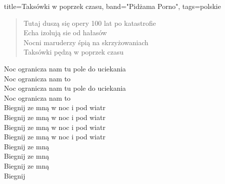\documentclass{article}
\begin{document}
\begin{song}{title={Taksówki w poprzek czasu}, band="Pidżama Porno", tags={polskie}}
\begin{verse}
Tutaj duszą się opery 100 lat po katastrofie \\ 
Echa izolują sie od hałasów \\
Nocni maruderzy śpią na skrzyżowaniach \\ 
Taksówki pędzą w poprzek czasu \\
\end{verse}

\begin{chorus}
Noc ogranicza nam tu pole do uciekania \\ 
Noc ogranicza nam to  \\
Noc ogranicza nam tu pole do uciekania \\ 
Noc ogranicza nam to \\

Biegnij ze mną w noc i pod wiatr \\ 
Biegnij ze mną w noc i pod wiatr \\
Biegnij ze mną w noc i pod wiatr \\
Biegnij ze mną w noc i pod wiatr \\
Biegnij ze mną \\
Biegnij ze mną \\
Biegnij ze mną \\
Biegnij \\
\end{chorus}

\end{song}
\end{document}
